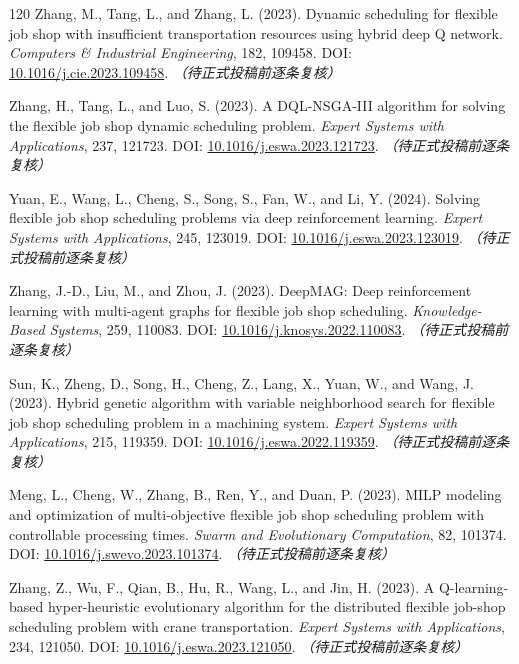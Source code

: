 \documentclass[UTF8,a4paper,11pt]{ctexart}
\begin{document}
\begin{thebibliography}{120}
Zhang, M., Tang, L., and Zhang, L. (2023). Dynamic scheduling for flexible job shop with insufficient transportation resources using hybrid deep Q network. \emph{Computers \& Industrial Engineering}, 182, 109458.
\newblock DOI: \href{https://doi.org/10.1016/j.cie.2023.109458}{10.1016/j.cie.2023.109458}. \textit{（待正式投稿前逐条复核）}

Zhang, H., Tang, L., and Luo, S. (2023). A DQL-NSGA-III algorithm for solving the flexible job shop dynamic scheduling problem. \emph{Expert Systems with Applications}, 237, 121723.
\newblock DOI: \href{https://doi.org/10.1016/j.eswa.2023.121723}{10.1016/j.eswa.2023.121723}. \textit{（待正式投稿前逐条复核）}

Yuan, E., Wang, L., Cheng, S., Song, S., Fan, W., and Li, Y. (2024). Solving flexible job shop scheduling problems via deep reinforcement learning. \emph{Expert Systems with Applications}, 245, 123019.
\newblock DOI: \href{https://doi.org/10.1016/j.eswa.2023.123019}{10.1016/j.eswa.2023.123019}. \textit{（待正式投稿前逐条复核）}

Zhang, J.-D., Liu, M., and Zhou, J. (2023). DeepMAG: Deep reinforcement learning with multi-agent graphs for flexible job shop scheduling. \emph{Knowledge-Based Systems}, 259, 110083.
\newblock DOI: \href{https://doi.org/10.1016/j.knosys.2022.110083}{10.1016/j.knosys.2022.110083}. \textit{（待正式投稿前逐条复核）}

Sun, K., Zheng, D., Song, H., Cheng, Z., Lang, X., Yuan, W., and Wang, J. (2023). Hybrid genetic algorithm with variable neighborhood search for flexible job shop scheduling problem in a machining system. \emph{Expert Systems with Applications}, 215, 119359.
\newblock DOI: \href{https://doi.org/10.1016/j.eswa.2022.119359}{10.1016/j.eswa.2022.119359}. \textit{（待正式投稿前逐条复核）}

Meng, L., Cheng, W., Zhang, B., Ren, Y., and Duan, P. (2023). MILP modeling and optimization of multi-objective flexible job shop scheduling problem with controllable processing times. \emph{Swarm and Evolutionary Computation}, 82, 101374.
\newblock DOI: \href{https://doi.org/10.1016/j.swevo.2023.101374}{10.1016/j.swevo.2023.101374}. \textit{（待正式投稿前逐条复核）}

Zhang, Z., Wu, F., Qian, B., Hu, R., Wang, L., and Jin, H. (2023). A Q-learning-based hyper-heuristic evolutionary algorithm for the distributed flexible job-shop scheduling problem with crane transportation. \emph{Expert Systems with Applications}, 234, 121050.
\newblock DOI: \href{https://doi.org/10.1016/j.eswa.2023.121050}{10.1016/j.eswa.2023.121050}. \textit{（待正式投稿前逐条复核）}


\end{thebibliography}
\end{document}
